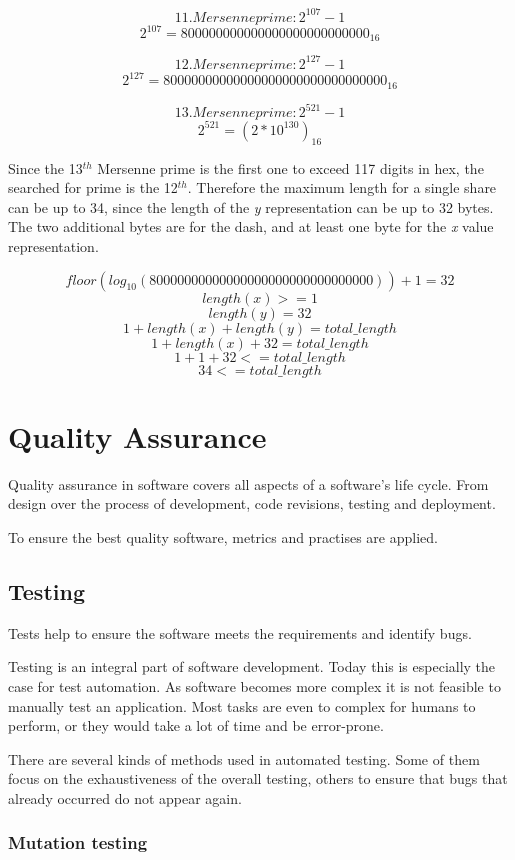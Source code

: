$$11. Mersenne prime: 2^{107}-1$$
$$2^{107} = 800000000000000000000000000_{16}$$

$$12. Mersenne prime: 2^{127}-1$$
$$2^{127} = 80000000000000000000000000000000_{16}$$

$$13. Mersenne prime: 2^{521}-1$$
$$2^{521} = (2*10^{130})_{16}$$

Since the 13$^{th}$ Mersenne prime is the first one to exceed 117 digits in
hex, the searched for prime is the 12$^{th}$. Therefore the maximum length for
a single share can be up to 34, since the length of the \textit{y}
representation can be up to 32 bytes. The two additional bytes are for the
dash, and at least one byte for the \textit{x} value representation.

$$floor(log_{10}(80000000000000000000000000000000)) + 1 = 32$$
$$length(x) >= 1$$
$$length(y) = 32$$
$$1 + length(x) + length(y) = total\_length$$
$$1 + length(x) + 32 = total\_length$$
$$1 + 1 + 32 <= total\_length$$
$$34 <= total\_length$$

\chapter{Quality Assurance}

Quality assurance in software covers all aspects of a software's life cycle.
From design over the process of development, code revisions, testing and
deployment.

To ensure the best quality software, metrics and practises are applied.

\section{Testing}

Tests help to ensure the software meets the requirements and identify bugs.

Testing is an integral part of software development. Today this is especially
the case for test automation. As software becomes more complex it is not
feasible to manually test an application. Most tasks are even to complex for
humans to perform, or they would take a lot of time and be error-prone.

There are several kinds of methods used in automated testing. Some of them
focus on the exhaustiveness of the overall testing, others to ensure that bugs
that already occurred do not appear again.

\subsection{Mutation testing}

